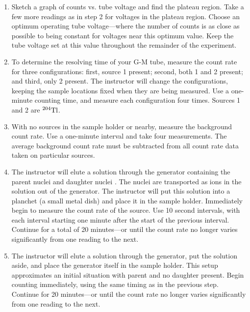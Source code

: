 \begin{enumerate}
\item Sketch a graph of counts vs. tube voltage and find the
plateau region.  Take a few more readings as in step 2 for voltages in
the plateau region.  Choose an optimum operating tube voltage---where
the number of counts is as close as possible to being constant for
voltages near this optimum value. Keep the tube voltage set at this
value throughout the remainder of the experiment.

\item To determine the resolving time of your G-M tube, measure the count rate
  for three configurations: first, source 1 present; second, both 1 and 2
  present; and third, only 2 present.  The instructor will change the
  configurations, keeping the sample locations fixed when they are being
  measured.  Use a one-minute counting time, and measure each configuration four
  times.  Sources 1 and 2 are ${}^{204}{\rm Tl}$.

\item With no sources in the sample holder or nearby, measure the
background count rate.  Use a one-minute interval and take four
measurements.  The average background count rate must be subtracted
from all count rate data taken on particular sources.

\item The instructor will elute a solution through the generator
containing the parent nuclei \cs and daughter nuclei \bam.  The
\bam nuclei are transported as ions in the solution out of the
generator.  The instructor will put this solution into a planchet (a
small metal dish) and place it in the sample holder.  Immediately
begin to measure the count rate of the \bam source.  Use 10 second
intervals, with each interval starting one
minute after the start of the previous interval.  Continue for a total
of 20 minutes---or until the count rate no longer varies significantly
from one reading to the next. 

\item The instructor will elute a solution through the \cs generator, put the
  solution aside, and place the generator itself in the sample holder. This
  setup approximates an initial situation with parent and no daughter
  present. Begin counting immediately, using the same timing as in the previous
  step.  Continue for 20 minutes---or until the count rate no longer varies
  significantly from one reading to the next.
\end{enumerate}

